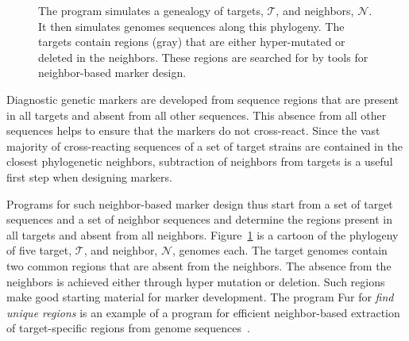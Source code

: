 \begin{figure}[ht]
  \begin{center}
    
\hspace{-2.8cm}
\end{center}
\caption{The program  simulates a genealogy of targets,
  $\mathcal{T}$, and neighbors, $\mathcal{N}$. It then simulates
  genomes sequences along this phylogeny. The targets contain regions
  (gray) that are either hyper-mutated or deleted in the
  neighbors. These regions are searched for by tools for
  neighbor-based marker design.}\label{fig:tn}
\end{figure}

Diagnostic genetic markers are developed from sequence regions that
are present in all targets and absent from all other sequences. This
absence from all other sequences helps to ensure that the markers do
not cross-react. Since the vast majority of cross-reacting sequences
of a set of target strains are contained in the closest phylogenetic
neighbors, subtraction of neighbors from targets is a useful first
step when designing markers.

Programs for such neighbor-based marker design thus start from a set
of target sequences and a set of neighbor sequences and determine the
regions present in all targets and absent from all
neighbors. Figure~\ref{fig:tn} is a cartoon of the phylogeny of five
target, $\mathcal{T}$, and neighbor, $\mathcal{N}$, genomes each. The
target genomes contain two common regions that are absent from the
neighbors. The absence from the neighbors is achieved either through
hyper mutation or deletion. Such regions make good starting material
for marker development. The program Fur for \emph{find unique regions}
is an example of a program for efficient neighbor-based extraction of
target-specific regions from genome sequences~\cite{hau21:fur}.

